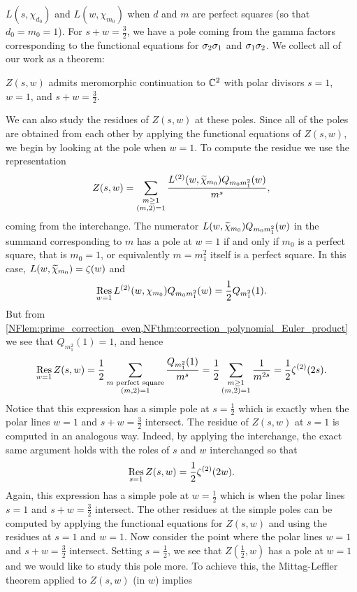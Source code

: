 $L(s,\chi_{d_{0}})$ and $L(w,\chi_{m_{0}})$ when $d$ and $m$ are perfect squares (so that $d_{0} = m_{0} = 1$). For $s+w = \frac{3}{2}$, we have a pole coming from the gamma factors corresponding to the functional equations for $\sigma_{2}\sigma_{1}$ and $\sigma_{1}\sigma_{2}$. We collect all of our work as a theorem:

    \begin{theorem}
        $Z(s,w)$ admits meromorphic continuation to $\mathbb{C}^{2}$ with polar divisors $s = 1$, $w = 1$, and $s+w = \frac{3}{2}$.
    \end{theorem}

    We can also study the residues of $Z(s,w)$ at these poles. Since all of the poles are obtained from each other by applying the functional equations of $Z(s,w)$, we begin by looking at the pole when $w = 1$. To compute the residue we use the representation
    \[
        Z(s,w) = \sum_{\substack{m \ge 1 \\ (m,2) = 1}}\frac{L^{(2)}(w,\widetilde{\chi}_{m_{0}})Q_{m_{0}m_{1}^{2}}(w)}{m^{s}},
    \]
    coming from the interchange. The numerator $L(w,\widetilde{\chi}_{m_{0}})Q_{m_{0}m_{1}^{2}}(w)$ in the summand corresponding to $m$ has a pole at $w = 1$ if and only if $m_{0}$ is a perfect square, that is $m_{0} = 1$, or equivalently $m = m_{1}^{2}$ itself is a perfect square. In this case, $L(w,\widetilde{\chi}_{m_{0}}) = \zeta(w)$ and
    \[
        \operatorname*{\mathrm{Res}}_{w = 1}L^{(2)}(w,\chi_{m_{0}})Q_{m_{0}m_{1}^{2}}(w) = \frac{1}{2}Q_{m_{1}^{2}}(1).
    \]
    But from \cref{NFlem:prime_correction_even,NFthm:correction_polynomial_Euler_product} we see that $Q_{m_{1}^{2}}(1) = 1$, and hence
    \[
        \operatorname*{\mathrm{Res}}_{w = 1}Z(s,w) = \frac{1}{2}\sum_{\substack{\text{$m$ perfect square} \\ (m,2) = 1}}\frac{Q_{m_{1}^{2}}(1)}{m^{s}} = \frac{1}{2}\sum_{\substack{m \ge 1 \\ (m,2) = 1}}\frac{1}{m^{2s}} = \frac{1}{2}\zeta^{(2)}(2s).
    \]
    Notice that this expression has a simple pole at $s = \frac{1}{2}$ which is exactly when the polar lines $w = 1$ and $s+w = \frac{3}{2}$ intersect. The residue of $Z(s,w)$ at $s = 1$ is computed in an analogous way. Indeed, by applying the interchange, the exact same argument holds with the roles of $s$ and $w$ interchanged so that
    \[
        \operatorname*{\mathrm{Res}}_{s = 1}Z(s,w) = \frac{1}{2}\zeta^{(2)}(2w).
    \]
    Again, this expression has a simple pole at $w = \frac{1}{2}$ which is when the polar lines $s = 1$ and $s+w = \frac{3}{2}$ intersect. The other residues at the simple poles can be computed by applying the functional equations for $Z(s,w)$ and using the residues at $s = 1$ and $w = 1$. Now consider the point where the polar lines $w = 1$ and $s+w = \frac{3}{2}$ intersect. Setting $s = \frac{1}{2}$, we see that $Z\left(\frac{1}{2},w\right)$ has a pole at $w= 1$ and we would like to study this pole more. To achieve this, the Mittag-Leffler theorem applied to $Z(s,w)$ (in $w$) implies
